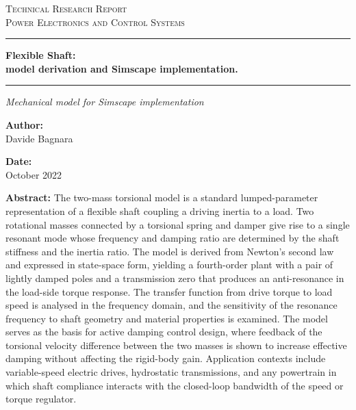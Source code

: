 \documentclass[12pt,a4paper]{scrartcl}
\newcommand{\DocCategory}{Technical Research Report}
\newcommand{\DocField}{Power Electronics and Control Systems}
\newcommand{\DocTitle}{%
	{\fontsize{24}{24}\selectfont\bfseries Flexible Shaft:} \\[16pt]
	{\fontsize{16}{20}\selectfont\bfseries model derivation and Simscape implementation.}
}
\newcommand{\DocSubtitle}{%
	Mechanical model for Simscape implementation
}
\newcommand{\DocAuthor}{Davide Bagnara}
\newcommand{\DocDate}{October 2022}
\newcommand{\DocAbstract}{%
	The two-mass torsional model is a standard lumped-parameter representation of a flexible shaft coupling a driving inertia to a load. Two rotational masses connected by a torsional spring and damper give rise to a single resonant mode whose frequency and damping ratio are determined by the shaft stiffness and the inertia ratio. The model is derived from Newton's second law and expressed in state-space form, yielding a fourth-order plant with a pair of lightly damped poles and a transmission zero that produces an anti-resonance in the load-side torque response.
	The transfer function from drive torque to load speed is analysed in the frequency domain, and the sensitivity of the resonance frequency to shaft geometry and material properties is examined. The model serves as the basis for active damping control design, where feedback of the torsional velocity difference between the two masses is shown to increase effective damping without affecting the rigid-body gain. Application contexts include variable-speed electric drives, hydrostatic transmissions, and any powertrain in which shaft compliance interacts with the closed-loop bandwidth of the speed or torque regulator.
}
\begin{document}
	\titlepage
	\begin{center}
		{\Large\scshape \DocCategory}\\[8pt]
		{\large\scshape \DocField}
	\end{center}
	
	\vspace{36pt}
	\noindent\rule{\linewidth}{0.8pt}
	
	\vspace{16pt}
	\begin{center}
		\DocTitle
	\end{center}
	
	\vspace{4pt}
	\noindent\rule{\linewidth}{2.2pt}
	
	\begin{center}
		\begin{onehalfspace}
			{\large\itshape \DocSubtitle}
		\end{onehalfspace}
	\end{center}
	
	\vspace{18pt}
	
	\begin{minipage}{0.92\linewidth}
		\noindent
		\begin{minipage}[t]{0.48\linewidth}
			\textbf{Author:}\\[2pt]
			\DocAuthor
		\end{minipage}%
		\hfill
		\begin{minipage}[t]{0.48\linewidth}
			\raggedleft
			\textbf{Date:}\\[2pt]
			\DocDate
		\end{minipage}
	\end{minipage}
	\vspace{36pt}
	
	\begin{center}
		\begin{minipage}{0.85\linewidth}
			\footnotesize 
			\begin{onehalfspace}
				\textbf{Abstract:} \DocAbstract
			\end{onehalfspace}
		\end{minipage}
	\end{center}
	
\end{document}
